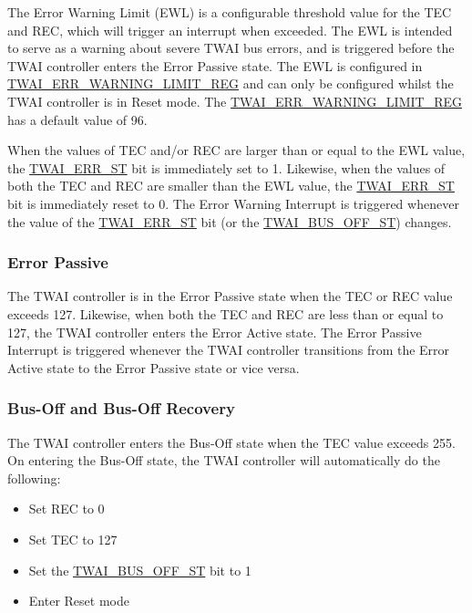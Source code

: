 \documentclass[main\_\_EN.tex]{subfiles}
\begin{document}
The Error Warning Limit (EWL) is a configurable threshold value for the TEC and REC, which will trigger an interrupt when exceeded. The EWL is intended to serve as a warning about severe TWAI bus errors, and is triggered before the TWAI controller enters the Error Passive state. The EWL is configured in \\\hyperref[regdesc:TWAIERRWARNINGLIMITREG]{TWAI\_ERR\_WARNING\_LIMIT\_REG} and can only be configured whilst the TWAI controller is in Reset mode. The \hyperref[regdesc:TWAIERRWARNINGLIMITREG]{TWAI\_ERR\_WARNING\_LIMIT\_REG} has a default value of 96.

When the values of TEC and/or REC are larger than or equal to the EWL value, the \hyperref[fielddesc:TWAIERRST]{TWAI\_ERR\_ST} bit is immediately set to 1. Likewise, when the values of both the TEC and REC are smaller than the EWL value, the \hyperref[fielddesc:TWAIERRST]{TWAI\_ERR\_ST} bit is immediately reset to 0. The Error Warning Interrupt is triggered whenever the value of the \hyperref[fielddesc:TWAIERRST]{TWAI\_ERR\_ST} bit (or the \hyperref[fielddesc:TWAIBUSOFFST]{TWAI\_BUS\_OFF\_ST}) changes.


\subsubsection{Error Passive}

The TWAI controller is in the Error Passive state when the TEC or REC value exceeds 127. Likewise, when both the TEC and REC are less than or equal to 127, the TWAI controller enters the Error Active state. The Error Passive Interrupt is triggered whenever the TWAI controller transitions from the Error Active state to the Error Passive state or vice versa.

\subsubsection{Bus-Off and Bus-Off Recovery}

The TWAI controller enters the Bus-Off state when the TEC value exceeds 255. On entering the Bus-Off state, the TWAI controller will automatically do the following:

\begin{itemize}
    \item Set REC to 0
    \item Set TEC to 127
    \item Set the \hyperref[fielddesc:TWAIBUSOFFST]{TWAI\_BUS\_OFF\_ST} bit to 1
    \item Enter Reset mode
\end{itemize}
\end{document}
